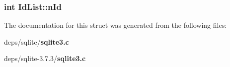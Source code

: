 \subsubsection{\setlength{\rightskip}{0pt plus 5cm}int \bf{Id\-List::n\-Id}}\label{structIdList_60e146f6ec8282db3ac077cc8a0c3058}




The documentation for this struct was generated from the following files:\begin{CompactItemize}
\item 
deps/sqlite/\bf{sqlite3.c}\item 
deps/sqlite-3.7.3/\bf{sqlite3.c}\end{CompactItemize}
